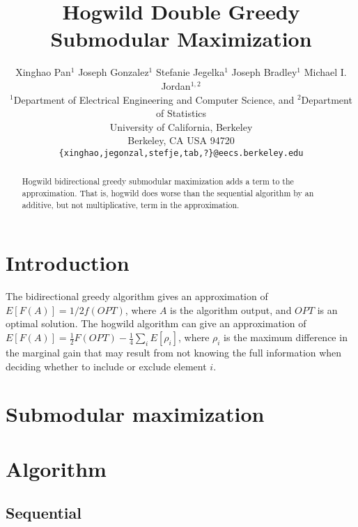 \documentclass{article} %
\title{Hogwild Double Greedy Submodular Maximization}
\author{
Xinghao Pan$^1$ Joseph Gonzalez$^1$ Stefanie Jegelka$^1$ Joseph Bradley$^{1}$ Michael I. Jordan$^{1,2}$\\
$^1$Department of Electrical Engineering and Computer Science, and $^2$Department of Statistics\\
University of California, Berkeley\\
Berkeley, CA USA 94720\\
  \texttt{\{xinghao,jegonzal,stefje,tab,?\}@eecs.berkeley.edu} \\
}
\begin{document}
\maketitle


\begin{abstract}
Hogwild bidirectional greedy submodular maximization adds a term to the approximation.
That is, hogwild does worse than the sequential algorithm by an additive, but not multiplicative, term in the approximation.
\end{abstract}

\section{Introduction}
The bidirectional greedy algorithm \cite{buchbinder2012} gives an approximation of $E[F(A)] = 1/2 f(OPT)$, where $A$ is the algorithm output, and $OPT$ is an optimal solution.
The hogwild algorithm can give an approximation of $E[F(A)] = \frac{1}{2} F(OPT) - \frac{1}{4}\sum_iE[\rho_i]$, where $\rho_i$ is the maximum difference in the marginal gain that may result from not knowing the full information when deciding whether to include or exclude element $i$.


\section{Submodular maximization}

\section{Algorithm}
\subsection{Sequential}
\end{document}

